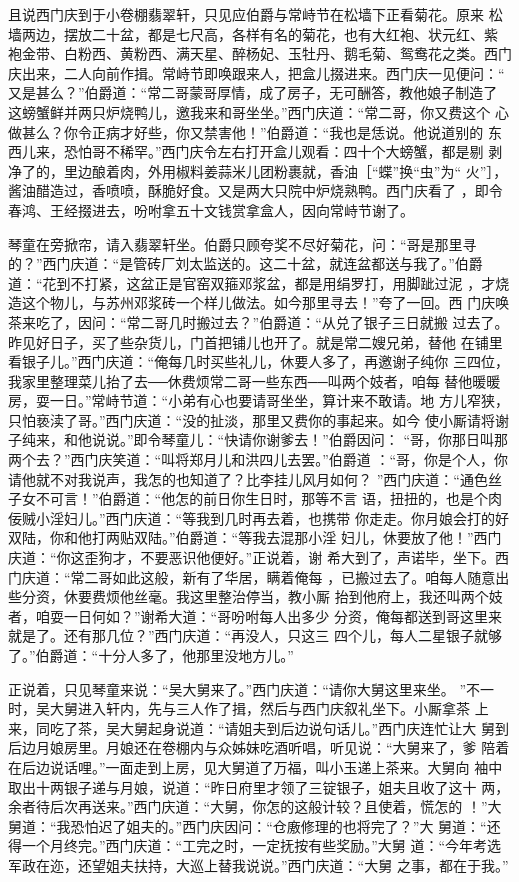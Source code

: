且说西门庆到于小卷棚翡翠轩，只见应伯爵与常峙节在松墙下正看菊花。原来
松墙两边，摆放二十盆，都是七尺高，各样有名的菊花，也有大红袍、状元红、紫
袍金带、白粉西、黄粉西、满天星、醉杨妃、玉牡丹、鹅毛菊、鸳鸯花之类。西门
庆出来，二人向前作揖。常峙节即唤跟来人，把盒儿掇进来。西门庆一见便问：“
又是甚么？”伯爵道：“常二哥蒙哥厚情，成了房子，无可酬答，教他娘子制造了
这螃蟹鲜并两只炉烧鸭儿，邀我来和哥坐坐。”西门庆道：“常二哥，你又费这个
心做甚么？你令正病才好些，你又禁害他！”伯爵道：“我也是恁说。他说道别的
东西儿来，恐怕哥不稀罕。”西门庆令左右打开盒儿观看：四十个大螃蟹，都是剔
剥净了的，里边酿着肉，外用椒料姜蒜米儿团粉裹就，香油［“蝶”换“虫”为“
火”］，酱油醋造过，香喷喷，酥脆好食。又是两大只院中炉烧熟鸭。西门庆看了
，即令春鸿、王经掇进去，吩咐拿五十文钱赏拿盒人，因向常峙节谢了。

琴童在旁掀帘，请入翡翠轩坐。伯爵只顾夸奖不尽好菊花，问：“哥是那里寻
的？”西门庆道：“是管砖厂刘太监送的。这二十盆，就连盆都送与我了。”伯爵
道：“花到不打紧，这盆正是官窑双箍邓浆盆，都是用绢罗打，用脚跐过泥
，才烧造这个物儿，与苏州邓浆砖一个样儿做法。如今那里寻去！”夸了一回。西
门庆唤茶来吃了，因问：“常二哥几时搬过去？”伯爵道：“从兑了银子三日就搬
过去了。昨见好日子，买了些杂货儿，门首把铺儿也开了。就是常二嫂兄弟，替他
在铺里看银子儿。”西门庆道：“俺每几时买些礼儿，休要人多了，再邀谢子纯你
三四位，我家里整理菜儿抬了去──休费烦常二哥一些东西──叫两个妓者，咱每
替他暖暖房，耍一日。”常峙节道：“小弟有心也要请哥坐坐，算计来不敢请。地
方儿窄狭，只怕亵渎了哥。”西门庆道：“没的扯淡，那里又费你的事起来。如今
使小厮请将谢子纯来，和他说说。”即令琴童儿：“快请你谢爹去！”伯爵因问：
“哥，你那日叫那两个去？”西门庆笑道：“叫将郑月儿和洪四儿去罢。”伯爵道
：“哥，你是个人，你请他就不对我说声，我怎的也知道了？比李挂儿风月如何？
”西门庆道：“通色丝子女不可言！”伯爵道：“他怎的前日你生日时，那等不言
语，扭扭的，也是个肉佞贼小淫妇儿。”西门庆道：“等我到几时再去着，也携带
你走走。你月娘会打的好双陆，你和他打两贴双陆。”伯爵道：“等我去混那小淫
妇儿，休要放了他！”西门庆道：“你这歪狗才，不要恶识他便好。”正说着，谢
希大到了，声诺毕，坐下。西门庆道：“常二哥如此这般，新有了华居，瞒着俺每
，已搬过去了。咱每人随意出些分资，休要费烦他丝毫。我这里整治停当，教小厮
抬到他府上，我还叫两个妓者，咱耍一日何如？”谢希大道：“哥吩咐每人出多少
分资，俺每都送到哥这里来就是了。还有那几位？”西门庆道：“再没人，只这三
四个儿，每人二星银子就够了。”伯爵道：“十分人多了，他那里没地方儿。”

正说着，只见琴童来说：“吴大舅来了。”西门庆道：“请你大舅这里来坐。
”不一时，吴大舅进入轩内，先与三人作了揖，然后与西门庆叙礼坐下。小厮拿茶
上来，同吃了茶，吴大舅起身说道：“请姐夫到后边说句话儿。”西门庆连忙让大
舅到后边月娘房里。月娘还在卷棚内与众姊妹吃酒听唱，听见说：“大舅来了，爹
陪着在后边说话哩。”一面走到上房，见大舅道了万福，叫小玉递上茶来。大舅向
袖中取出十两银子递与月娘，说道：“昨日府里才领了三锭银子，姐夫且收了这十
两，余者待后次再送来。”西门庆道：“大舅，你怎的这般计较？且使着，慌怎的
！”大舅道：“我恐怕迟了姐夫的。”西门庆因问：“仓廒修理的也将完了？”大
舅道：“还得一个月终完。”西门庆道：“工完之时，一定抚按有些奖励。”大舅
道：“今年考选军政在迩，还望姐夫扶持，大巡上替我说说。”西门庆道：“大舅
之事，都在于我。”

